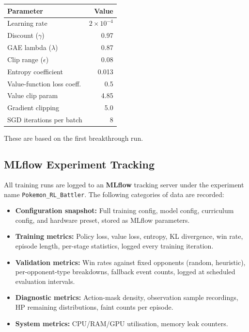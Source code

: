 \begin{center}
\small
\begin{tabularx}{0.7\textwidth}{l r}
  \toprule
  \textbf{Parameter} & \textbf{Value} \\
  \midrule
  Learning rate              & $2 \times 10^{-4}$ \\
  Discount ($\gamma$)        & 0.97 \\
  GAE lambda ($\lambda$)     & 0.87 \\
  Clip range ($\epsilon$)    & 0.08 \\
  Entropy coefficient        & 0.013 \\
  Value-function loss coeff. & 0.5 \\
  Value clip param           & 4.85 \\
  Gradient clipping          & 5.0 \\
  SGD iterations per batch   & 8 \\
  \bottomrule
\end{tabularx}
\end{center}

These are based on the first breakthrough run.

\subsection{MLflow Experiment Tracking}

All training runs are logged to an \textbf{MLflow} tracking server under the
experiment name \texttt{Pokemon\_RL\_Battler}.  The following categories of
data are recorded:

\begin{itemize}
  \item \textbf{Configuration snapshot:} Full training config, model config,
        curriculum config, and hardware preset, stored as MLflow parameters.
  \item \textbf{Training metrics:} Policy loss, value loss, entropy,
        KL divergence, win rate, episode length, per-stage statistics, logged
        every training iteration.
  \item \textbf{Validation metrics:} Win rates against fixed opponents
        (random, heuristic), per-opponent-type breakdowns, fallback event
        counts, logged at scheduled evaluation intervals.
  \item \textbf{Diagnostic metrics:} Action-mask density, observation sample
        recordings, HP remaining distributions, faint counts per episode.
  \item \textbf{System metrics:} CPU/RAM/GPU utilisation, memory leak counters.
\end{itemize}

